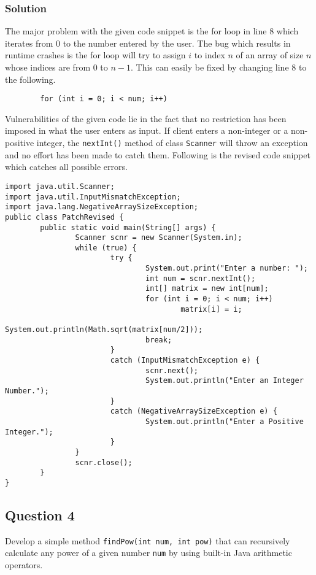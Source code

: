 \documentclass[12pt,letterpaper,twoside]{article}
\begin{document}
\subsubsection*{Solution}

The major problem with the given code snippet is the for loop in line 8 which iterates from 0 to the number entered by the user. The bug which results in runtime crashes is the for loop will try to assign $i$ to index $n$ of an array of size $n$ whose indices are from 0 to $n-1$. This can easily be fixed by changing line 8 to the following.
\lstset{language=java, tabsize=2, firstnumber=8}
\begin{lstlisting}
		for (int i = 0; i < num; i++)
\end{lstlisting}

Vulnerabilities of the given code lie in the fact that no restriction has been imposed in what the user enters as input. If client enters a non-integer or a non-positive integer, the \texttt{nextInt()} method of class \texttt{Scanner} will throw an exception and no effort has been made to catch them. Following is the revised code snippet which catches all possible errors.

\lstset{language=java, tabsize=2, firstnumber=1}
\begin{lstlisting}
import java.util.Scanner;
import java.util.InputMismatchException;
import java.lang.NegativeArraySizeException;
public class PatchRevised {
		public static void main(String[] args) {
				Scanner scnr = new Scanner(System.in);
				while (true) {
						try {
								System.out.print("Enter a number: ");
								int num = scnr.nextInt();
								int[] matrix = new int[num];
								for (int i = 0; i < num; i++)
										matrix[i] = i;
								System.out.println(Math.sqrt(matrix[num/2]));
								break;
						}
						catch (InputMismatchException e) {
								scnr.next();
								System.out.println("Enter an Integer Number.");
						}
						catch (NegativeArraySizeException e) {
								System.out.println("Enter a Positive Integer.");
						}
				}
				scnr.close();
		}
}
\end{lstlisting}

\subsection*{Question 4}

Develop a simple method \texttt{findPow(int num, int pow)} that can recursively calculate any power of a given number \texttt{num} by using built-in Java arithmetic operators.
\end{document}
